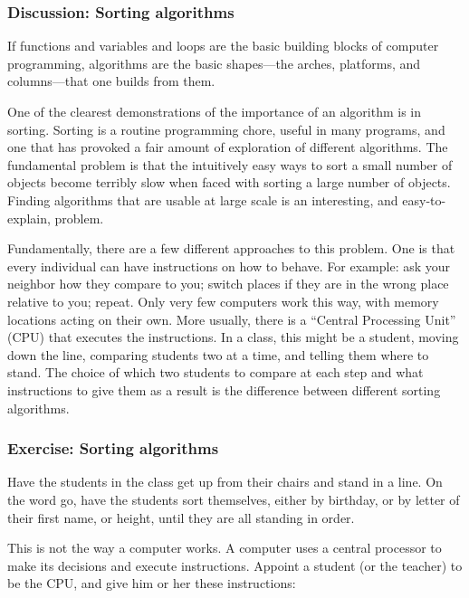 \documentclass[11pt]{article}
\begin{document}
\subsubsection{Discussion: Sorting algorithms}

If functions and variables and loops are the basic building blocks of
computer programming, algorithms are the basic shapes---the arches,
platforms, and columns---that one builds from them.

One of the clearest demonstrations of the importance of an algorithm
is in sorting.  Sorting is a routine programming chore, useful in many
programs, and one that has provoked a fair amount of exploration of
different algorithms.  The fundamental problem is that the intuitively
easy ways to sort a small number of objects become terribly slow when
faced with sorting a large number of objects.  Finding algorithms that
are usable at large scale is an interesting, and easy-to-explain,
problem.

Fundamentally, there are a few different approaches to this problem.
One is that every individual can have instructions on how to behave.
For example: ask your neighbor how they compare to you; switch places
if they are in the wrong place relative to you; repeat.  Only very few
computers work this way, with memory locations acting on their own.
More usually, there is a ``Central Processing Unit'' (CPU) that
executes the instructions.  In a class, this might be a student,
moving down the line, comparing students two at a time, and telling
them where to stand.  The choice of which two students to compare at
each step and what instructions to give them as a result is the
difference between different sorting algorithms.


\subsubsection{Exercise: Sorting algorithms}

Have the students in the class get up from their chairs and stand in a
line.  On the word go, have the students sort themselves, either by
birthday, or by letter of their first name, or height, until they are
all standing in order.

This is not the way a computer works.  A computer uses a central
processor to make its decisions and execute instructions.  Appoint a
student (or the teacher) to be the CPU, and give him or her these
instructions: 
\end{document}
